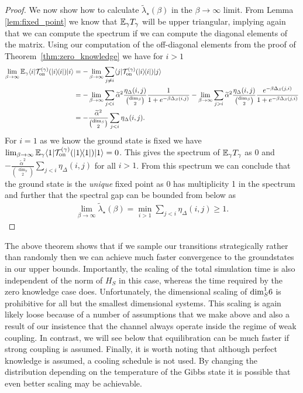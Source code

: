 \begin{proof}
We now show how to calculate $\widetilde{\lambda}_\star(\beta)$ in the $\beta \to \infty$ limit. From Lemma \ref{lem:fixed_point} we know that $\mathbb{E}_\gamma T_\gamma$ will be upper triangular, implying again that we can compute the spectrum if we can compute the diagonal elements of the matrix. Using our computation of the off-diagonal elements from the proof of Theorem~\ref{thm:zero_knowledge} we have for $i > 1$
\begin{align}
    \lim_{\beta \to \infty} \mathbb{E}_\gamma \langle i| \mathcal{T}_{\rm on}^{(\gamma)}(| i\rangle\! \langle i|) |i\rangle &= - \lim_{\beta \to \infty} \sum_{j \neq i} \langle j| \mathcal{T}_{\rm on}^{(\gamma)}(| i\rangle\! \langle i|) |j\rangle \\
    &= - \lim_{\beta \to \infty} \sum_{j < i} \widetilde{\alpha}^2 \frac{\eta_\Delta(i,j)}{\binom{\dim_S}{2}} \frac{1}{1 + e^{-\beta \Delta_S(i,j)}} - \lim_{\beta \to \infty} \sum_{j > i} \widetilde{\alpha}^2 \frac{\eta_\Delta(i,j)}{\binom{\dim_S}{2}} \frac{e^{-\beta \Delta_S(j, i)}}{1 + e^{-\beta \Delta_S(j, i)}} \\
    &= - \frac{\widetilde{\alpha}^2}{\binom{\dim_S}{2}} \sum_{j < i} \eta_\Delta(i,j).
\end{align}
For $i = 1$ as we know the ground state is fixed we have $\lim_{\beta \to \infty} \mathbb{E}_\gamma \langle 1| \mathcal{T}_{\rm on}^{(\gamma)}(| 1\rangle\! \langle 1|) |1\rangle = 0$. This gives the spectrum of $\mathbb{E}_\gamma T_\gamma$ as 0 and $- \frac{\widetilde{\alpha}^2}{\binom{\dim_S}{2}} \sum_{j < i} \eta_\Delta(i,j)$ for all $i > 1$. From this spectrum we can conclude that the ground state is the \emph{unique} fixed point as 0 has multiplicity 1 in the spectrum and further that the spectral gap can be bounded from below as
\begin{align}
    \lim_{\beta \to \infty} \widetilde{\lambda}_\star(\beta) = \min_{i > 1} \sum_{j < i} \eta_\Delta(i,j) \ge 1.
\end{align}
\end{proof}

The above theorem shows that if we sample our transitions strategically rather than randomly then we can achieve much faster convergence to the groundstates in our upper bounds.  Importantly, the scaling of the total simulation time is also independent of the norm of $H_S$ in this case, whereas the time required by the zero knowledge case does.  Unfortunately, the dimensional scaling of ${\rm dim}_S^16$ is prohibitive for all but the smallest dimensional systems.  This scaling is again likely loose because of a number of assumptions that we make above and also a result of our insistence that the channel always operate inside the regime of weak coupling.  In contrast, we will see below that equilibration can be much faster if strong coupling is assumed.  Finally, it is worth noting that although perfect knowledge is assumed, a cooling schedule is not used.  By changing the distribution depending on the temperature of the Gibbs state it is possible that even better scaling may be achievable.

